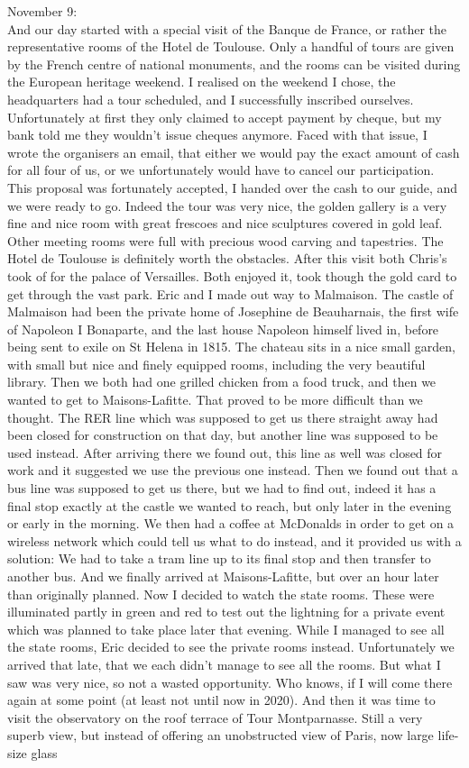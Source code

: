 November 9:\\
And our day started with a special visit of the Banque de France, or rather the representative rooms of the Hotel de Toulouse. Only a handful of tours are given by the French centre of national monuments, and the rooms can be visited during the European heritage weekend. I realised on the weekend I chose, the headquarters had a tour scheduled, and I successfully inscribed ourselves. Unfortunately at first they only claimed to accept payment by cheque, but my bank told me they wouldn't issue cheques anymore. Faced with that issue, I wrote the organisers an email, that either we would pay the exact amount of cash for all four of us, or we unfortunately would have to cancel our participation. This proposal was fortunately accepted, I handed over the cash to our guide, and we were ready to go. Indeed the tour was very nice, the golden gallery is a very fine and nice room with great frescoes and nice sculptures covered in gold leaf. Other meeting rooms were full with precious wood carving and tapestries. The Hotel de Toulouse is definitely worth the obstacles. After this visit both Chris's took of for the palace of Versailles. Both enjoyed it, took though the gold card to get through the vast park. Eric and I made out way to Malmaison. The castle of Malmaison had been the private home of Josephine de Beauharnais, the first wife of Napoleon I Bonaparte, and the last house Napoleon himself lived in, before being sent to exile on St Helena in 1815. The chateau sits in a nice small garden, with small but nice and finely equipped rooms, including the very beautiful library. Then we both had one grilled chicken from a food truck, and then we wanted to get to Maisons-Lafitte. That proved to be more difficult than we thought. The RER line which was supposed to get us there straight away had been closed for construction on that day, but another line was supposed to be used instead. After arriving there we found out, this line as well was closed for work and it suggested we use the previous one instead. Then we found out that a bus line was supposed to get us there, but we had to find out, indeed it has a final stop exactly at the castle we wanted to reach, but only later in the evening or early in the morning. We then had a coffee at McDonalds in order to get on a wireless network which could tell us what to do instead, and it provided us with a solution: We had to take a tram line up to its final stop and then transfer to another bus. And we finally arrived at Maisons-Lafitte, but over an hour later than originally planned. Now I decided to watch the state rooms. These were illuminated partly in green and red to test out the lightning for a private event which was planned to take place later that evening. While I managed to see all the state rooms, Eric decided to see the private rooms instead. Unfortunately we arrived that late, that we each didn't manage to see all the rooms. But what I saw was very nice, so not a wasted opportunity. Who knows, if I will come there again at some point (at least not until now in 2020). And then it was time to visit the observatory on the roof terrace of Tour Montparnasse. Still a very superb view, but instead of offering an unobstructed view of Paris, now large life-size glass 